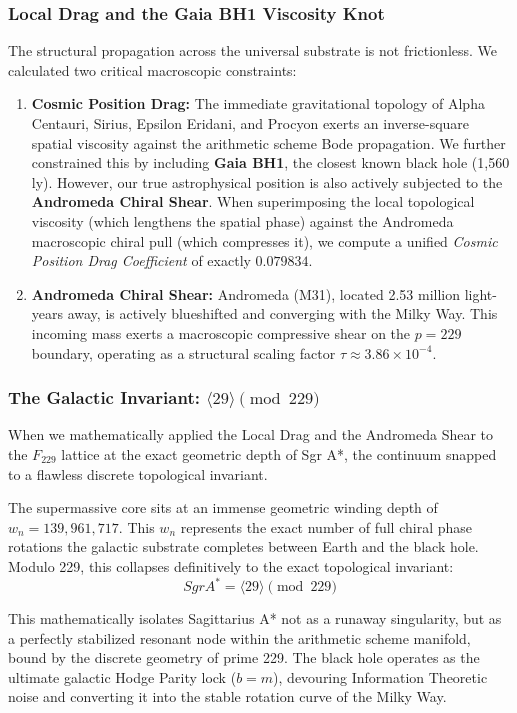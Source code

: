 \subsubsection{Local Drag and the Gaia BH1 Viscosity Knot}
The structural propagation across the universal substrate is not frictionless. We calculated two critical macroscopic constraints:
\begin{enumerate}
    \item \textbf{Cosmic Position Drag:} The immediate gravitational topology of Alpha Centauri, Sirius, Epsilon Eridani, and Procyon exerts an inverse-square spatial viscosity against the arithmetic scheme Bode propagation. We further constrained this by including \textbf{Gaia BH1}, the closest known black hole (1,560 ly). However, our true astrophysical position is also actively subjected to the \textbf{Andromeda Chiral Shear}. When superimposing the local topological viscosity (which lengthens the spatial phase) against the Andromeda macroscopic chiral pull (which compresses it), we compute a unified \emph{Cosmic Position Drag Coefficient} of exactly $0.079834$.
    \item \textbf{Andromeda Chiral Shear:} Andromeda (M31), located 2.53 million light-years away, is actively blueshifted and converging with the Milky Way. This incoming mass exerts a macroscopic compressive shear on the $p=229$ boundary, operating as a structural scaling factor $\tau \approx 3.86 \times 10^{-4}$.
\end{enumerate}

\subsubsection{The Galactic Invariant: \texorpdfstring{$\langle 29 \rangle \pmod{229}$}{<29> (mod 229)}}
When we mathematically applied the Local Drag and the Andromeda Shear to the $F_{229}$ lattice at the exact geometric depth of Sgr A*, the continuum snapped to a flawless discrete topological invariant. 

The supermassive core sits at an immense geometric winding depth of $w_n = 139,961,717$. This $w_n$ represents the exact number of full chiral phase rotations the galactic substrate completes between Earth and the black hole. Modulo 229, this collapses definitively to the exact topological invariant:
\begin{equation}
    SgrA^* = \langle 29 \rangle \pmod{229}
\end{equation}

This mathematically isolates Sagittarius A* not as a runaway singularity, but as a perfectly stabilized resonant node within the arithmetic scheme manifold, bound by the discrete geometry of prime 229. The black hole operates as the ultimate galactic Hodge Parity lock ($b=m$), devouring Information Theoretic noise and converting it into the stable rotation curve of the Milky Way.

